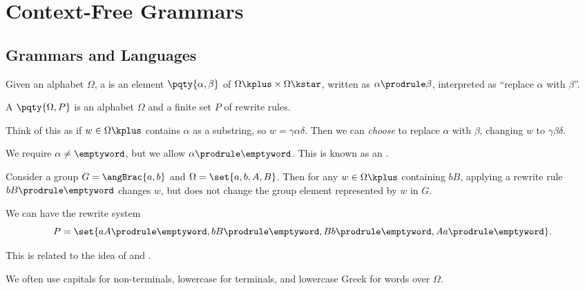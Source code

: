 \section{Context-Free Grammars}
\subsection{Grammars and Languages}

\begin{definition}
    Given an alphabet \(\Omega\), a  is an element \(\pqty{\alpha, \beta}\) of \(\Omega\kplus \times \Omega\kstar\), written as \(\alpha \prodrule \beta\), interpreted as ``replace \(\alpha\) with \(\beta\)''.

    A  \(\pqty{\Omega, P}\) is an alphabet \(\Omega\) and a finite set \(P\) of rewrite rules.
\end{definition}

Think of this as if \(w \in \Omega\kplus\) contains \(\alpha\) as a substring, so \(w = \gamma \alpha \delta\). Then we can \emph{choose} to replace \(\alpha\) with \(\beta\), changing \(w\) to \(\gamma \beta \delta\).

\begin{remark}
    We require \(\alpha \neq \emptyword\), but we allow \(\alpha \prodrule \emptyword\). This is known as an .
\end{remark}

\begin{example*}
    Consider a group \(G = \angBrac{a, b}\) and \(\Omega = \set{a, b, A, B}\). Then for any \(w \in \Omega\kplus\) containing \(bB\), applying a rewrite rule \(bB \prodrule \emptyword\) changes \(w\), but does not change the group element represented by \(w\) in \(G\).
    
    We can have the rewrite system
    \[
        P = \set{aA \prodrule \emptyword, bB \prodrule \emptyword, Bb \prodrule \emptyword, Aa \prodrule \emptyword}.
    \]
    
    This is related to the idea of  and .
\end{example*}

\begin{notation}
    We often use capitals for non-terminals, lowercase for terminals, and lowercase Greek for words over \(\Omega\).
\end{notation}

